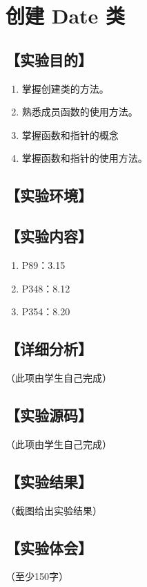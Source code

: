 \section{创建 Date 类}
\hfill{}
\subsection*{【实验目的】}
\begin{enumerate}[topsep=0pt,partopsep=0pt,itemsep=0pt,parsep=0pt,label={\arabic*、}]
\item 掌握创建类的方法。
\item 熟悉成员函数的使用方法。
\item 掌握函数和指针的概念
\item 掌握函数和指针的使用方法。
\end{enumerate}
\subsection*{【实验环境】}
\MyEnvironment
\subsection*{【实验内容】}
\begin{enumerate}[topsep=0pt,partopsep=0pt,itemsep=0pt,parsep=0pt,label={\arabic*、}]
\item P89：3.15
\item P348：8.12
\item P354：8.20
\end{enumerate}
\subsection*{【详细分析】}
（此项由学生自己完成）
\subsection*{【实验源码】}
（此项由学生自己完成）
\subsection*{【实验结果】}
（截图给出实验结果）
\subsection*{【实验体会】}
（至少150字）
